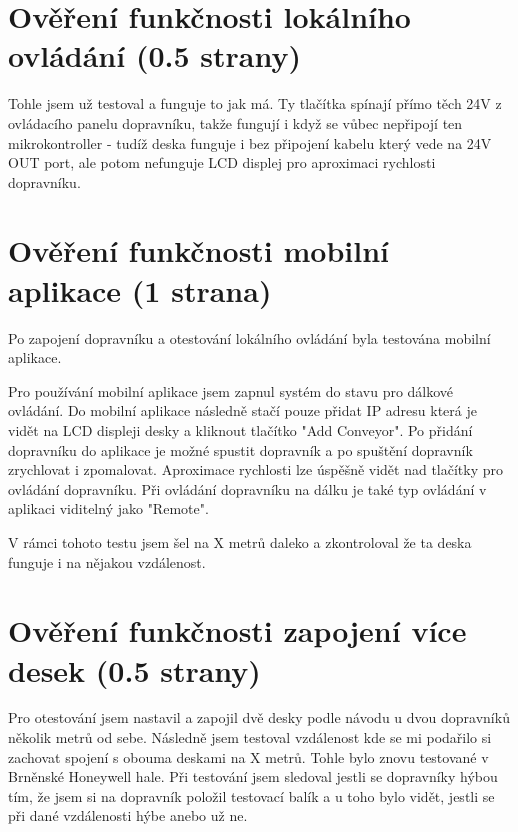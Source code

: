 \section{Ověření funkčnosti lokálního ovládání (0.5 strany)}

Tohle jsem už testoval a funguje to jak má. Ty tlačítka spínají přímo těch 24V z ovládacího panelu dopravníku, takže fungují i když se vůbec nepřipojí ten mikrokontroller - tudíž deska funguje i bez připojení kabelu který vede na 24V OUT port, ale potom nefunguje LCD displej pro aproximaci rychlosti dopravníku.

\section{Ověření funkčnosti mobilní aplikace (1 strana)}

Po zapojení dopravníku a otestování lokálního ovládání byla testována mobilní aplikace.

Pro používání mobilní aplikace jsem zapnul systém do stavu pro dálkové ovládání. Do mobilní aplikace následně stačí pouze přidat IP adresu která je vidět na LCD displeji desky a kliknout tlačítko "Add Conveyor". Po přidání dopravníku do aplikace je možné spustit dopravník a po spuštění dopravník zrychlovat i zpomalovat. Aproximace rychlosti lze úspěšně vidět nad tlačítky pro ovládání dopravníku. Při ovládání dopravníku na dálku je také typ ovládání v aplikaci viditelný jako "Remote".

V rámci tohoto testu jsem šel na X metrů daleko a zkontroloval že ta deska funguje i na nějakou vzdálenost.

\section{Ověření funkčnosti zapojení více desek (0.5 strany)}

Pro otestování jsem nastavil a zapojil dvě desky podle návodu u dvou dopravníků několik metrů od sebe. Následně jsem testoval vzdálenost kde se mi podařilo si zachovat spojení s obouma deskami na X metrů. Tohle bylo znovu testované v Brněnské Honeywell hale. Při testování jsem sledoval jestli se dopravníky hýbou tím, že jsem si na dopravník položil testovací balík a u toho bylo vidět, jestli se při dané vzdálenosti hýbe anebo už ne.

